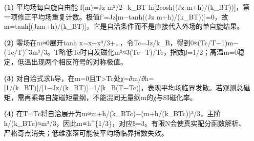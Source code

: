 \par\noindent\textbf{(1)} 平均场每自旋自由能 f(m)=Jz m²/2−k\_BT ln[2cosh((Jz m+h)/(k\_BT))]，第一项修正平均场重复计数。极值f'=Jz[m−tanh((Jz m+h)/(k\_BT))]=0，故m=tanh[(Jzm+h)/(k\_BT)]，它是自洽条件而不是直接代入外场的单自旋结果。
\par\noindent\textbf{(2)} 零场在m≈0展开tanh x=x−x³/3+…，令Tc=Jz/k\_B，得到0≈(Tc/T−1)m−(Tc/T)\textasciicircum{}3m³/3。T略低Tc时自发磁化m²≈3(Tc−T)/Tc，指数β=1/2；高温m=0稳定，低温出现两个相反符号的对称极值。
\par\noindent\textbf{(3)} 对自洽式求h导，在m=0且T>Tc处χ=∂m/∂h=[1/(k\_BT)]/[1−Jz/(k\_BT)]=1/[k\_B(T−Tc)]，表现平均场临界发散。若观测总磁矩，需再乘每自旋磁矩量纲，不能混同无量纲m的χ与SI磁化率。
\par\noindent\textbf{(4)} 在T=Tc将自洽展开为m≈m+h/(k\_BTc)−(m+h/(k\_BTc))³/3，主阶h/(k\_BTc)≈m³/3，因此m∝h\textasciicircum{}\{1/3\}，对应δ=3。有限N会使真实配分函数解析、严格奇点消失；低维涨落可能使平均场临界指数失效。
